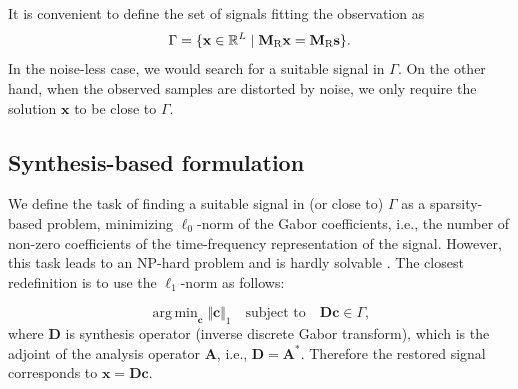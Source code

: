 \documentclass[conference]{IEEEtran}
\newcommand{\todo}[1]{\textcolor{red}{#1}}
\begin{document}
It is convenient to define the set of signals fitting the observation as
\begin{equation}
	\label{eq:Gamma}
	\Gamma = \lbrace \mathbf{x}\in \mathbb {R}^L\mid \mathbf{M}_{\textup{R}}\mathbf{x}=\mathbf{M}_{\textup{R}}\mathbf {s}\rbrace.
\end{equation}
In the noise-less case, we would search for a suitable signal in $\Gamma$.
On the other hand, when the observed samples are distorted by noise, we only require the solution $\mathbf{x}$ to be close to $\Gamma$.

\subsection{Synthesis-based formulation}\label{subsec:freqcoef}

We define the task of finding a suitable signal in (or close to) $\Gamma$ as a sparsity-based problem, minimizing $ \ell_0 $-norm of the Gabor coefficients, i.e., the number of non-zero coefficients of the time-frequency representation of the signal.
However, this task leads to an NP-hard problem and is hardly solvable \cite{Mokry2020}.
The closest redefinition is to use the $ \ell_1 $-norm as follows:

\begin{equation}
	\label{eq:synthesis.gamma}
	\mathop {\operatorname{arg \, min}}_\mathbf {c}\Vert \mathbf {c}\Vert _1 \quad \text{subject to}\quad \mathbf{D}\mathbf {c}\in \Gamma,
\end{equation} 
where $\mathbf{D} $ is synthesis operator (inverse discrete Gabor transform), which is the adjoint of the analysis operator $ \mathbf{A} $, i.e., $ \mathbf{D} = \mathbf{A}^* $.
Therefore the restored signal corresponds to $ \mathbf {x} =  \mathbf{D}\mathbf {c}$.

\end{document}
